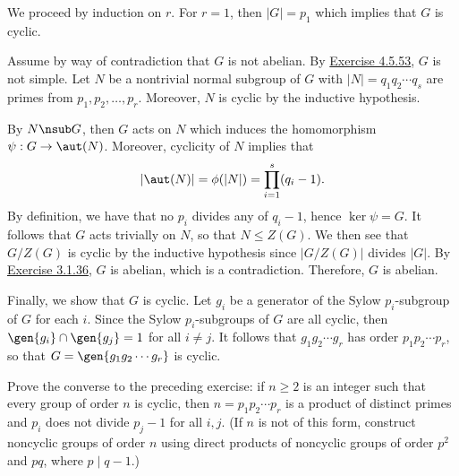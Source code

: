\begin{sol}
	We proceed by induction on $r$. For $r = 1$, then $|G| = p_1$ which implies that $G$ is cyclic.

	Assume by way of contradiction that $G$ is not abelian. By \hyperref[ex4.5.53]{Exercise 4.5.53}, $G$ is not simple. Let $N$ be a nontrivial normal subgroup of $G$ with $|N| = q_1q_2 \cdots q_s$ are primes from $p_1, p_2, \ldots, p_r$. Moreover, $N$ is cyclic by the inductive hypothesis.

	By $N \nsub G$, then $G$ acts on $N$ which induces the homomorphism $\psi : G \to \aut(N)$. Moreover, cyclicity of $N$ implies that
	\[|\aut(N)| = \phi(|N|) = \prod_{i = 1}^s (q_i - 1).\]
	By definition, we have that no $p_i$ divides any of $q_i - 1$, hence $\ker\psi = G$. It follows that $G$ acts trivially on $N$, so that $N \leq Z(G)$. We then see that $G/Z(G)$ is cyclic by the inductive hypothesis since $|G/Z(G)|$ divides $|G|$. By \hyperref[ex3.1.36]{Exercise 3.1.36}, $G$ is abelian, which is a contradiction. Therefore, $G$ is abelian.

	Finally, we show that $G$ is cyclic. Let $g_i$ be a generator of the Sylow $p_i$-subgroup of $G$ for each $i$. Since the Sylow $p_i$-subgroups of $G$ are all cyclic, then $\gen{g_i} \cap \gen{g_j} = 1$ for all $i \neq j$. It follows that $g_1g_2 \cdots g_r$ has order $p_1p_2 \cdots p_r$, so that $G = \gen{g_1g_2 \cdots g_r}$ is cyclic.
\end{sol}

\begin{exercise}\label{ex4.5.55}
	Prove the converse to the preceding exercise: if $n \geq 2$ is an integer such that every group of order $n$ is cyclic, then $n = p_1p_2 \cdots p_r$ is a product of distinct primes and $p_i$ does not divide $p_j - 1$ for all $i, j$. (If $n$ is not of this form, construct noncyclic groups of order $n$ using direct products of noncyclic groups of order $p^2$ and $pq$, where $p \mid q - 1$.)
\end{exercise}

